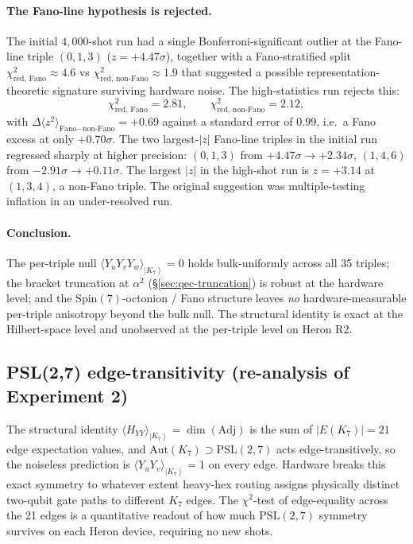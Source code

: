 \documentclass[11pt]{article}
\newcommand{\Spin}{\mathrm{Spin}}
\newcommand{\Adj}{\mathrm{Adj}}
\newcommand{\ket}[1]{\left|#1\right\rangle}
\newcommand{\Aut}{\mathrm{Aut}}
\begin{document}
\paragraph{The Fano-line hypothesis is rejected.}
The initial $4{,}000$-shot run had a single Bonferroni-significant
outlier at the Fano-line triple $(0,1,3)$ ($z = +4.47\sigma$),
together with a Fano-stratified split
$\chi^2_{\text{red, Fano}} \approx 4.6$ vs
$\chi^2_{\text{red, non-Fano}} \approx 1.9$ that suggested a
possible representation-theoretic signature surviving hardware
noise.  The high-statistics run rejects this:
\begin{equation}
  \chi^2_{\text{red, Fano}} = 2.81,\qquad
  \chi^2_{\text{red, non-Fano}} = 2.12,
\end{equation}
with $\Delta\langle z^2\rangle_{\text{Fano}-\text{non-Fano}} = +0.69$
against a standard error of $0.99$, i.e.\ a Fano excess at only
$+0.70\sigma$.  The two largest-$|z|$ Fano-line triples in the
initial run regressed sharply at higher precision:
$(0,1,3)$ from $+4.47\sigma \to +2.34\sigma$, $(1,4,6)$ from
$-2.91\sigma \to +0.11\sigma$.  The largest $|z|$ in the high-shot
run is $z = +3.14$ at $(1,3,4)$, a non-Fano triple.  The original
suggestion was multiple-testing inflation in an
under-resolved run.

\paragraph{Conclusion.}  The per-triple null
$\langle Y_uY_vY_w\rangle_{\ket{K_7}} = 0$ holds bulk-uniformly
across all 35 triples; the bracket truncation at $\alpha^2$
(\S\ref{sec:qec-truncation}) is robust at the hardware level; and
the $\Spin(7)$-octonion / Fano structure leaves \emph{no}
hardware-measurable per-triple anisotropy beyond the bulk null.
The structural identity is exact at the Hilbert-space level and
unobserved at the per-triple level on Heron R2.

\subsection{PSL(2,7) edge-transitivity (re-analysis of Experiment 2)}
\label{sec:heron-psl27}

The structural identity $\langle H_{YY}\rangle_{\ket{K_7}} =
\dim(\Adj)$ is the sum of $|E(K_7)| = 21$ edge expectation
values, and $\Aut(K_7) \supset \mathrm{PSL}(2,7)$ acts
edge-transitively, so the noiseless prediction is
$\langle Y_u Y_v\rangle_{\ket{K_7}} = 1$ on every edge.  Hardware
breaks this exact symmetry to whatever extent heavy-hex routing
assigns physically distinct two-qubit gate paths to different
$K_7$ edges.  The $\chi^2$-test of edge-equality across the 21
edges is a quantitative readout of how much $\mathrm{PSL}(2,7)$
symmetry survives on each Heron device, requiring no new shots.
\end{document}
